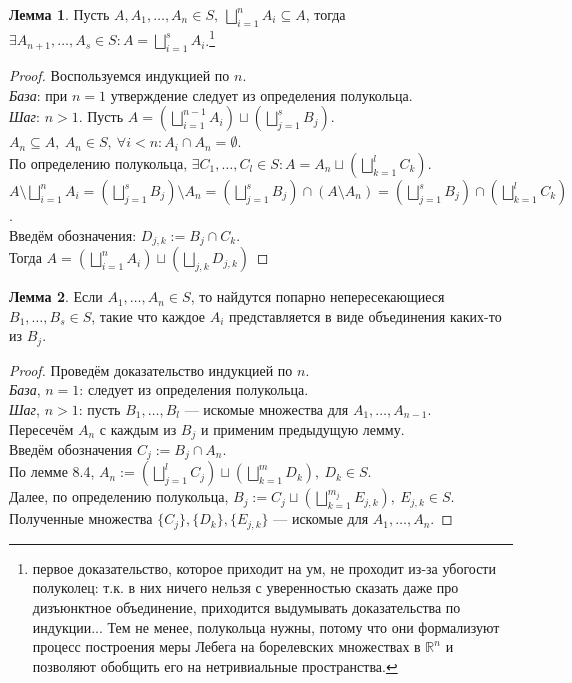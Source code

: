 \documentclass[11pt,a4paper]{report}
\theoremstyle{definition}
\theoremstyle{definition}
\newtheorem{lemma}{Лемма}[section]
\theoremstyle{definition}
\begin{document}
	\begin{lemma}
		Пусть $ A, A_{1}, \dots, A_{n} \in S,\ \bigsqcup_{i=1}^{n}{A_{i}} \subseteq A $, тогда $ \exists A_{n+1}, \dots, A_{s} \in S: A = \bigsqcup_{i=1}^{s}{A_{i}} $.\footnote{первое доказательство, которое приходит на ум, не проходит из-за убогости полуколец: т.к. в них ничего нельзя с уверенностью сказать даже про дизъюнктное объединение, приходится выдумывать доказательства по индукции... Тем не менее, полукольца нужны, потому что они формализуют процесс построения меры Лебега на борелевских множествах в $ \mathbb{R}^{n} $ и позволяют обобщить его на нетривиальные пространства.}   
	\end{lemma}
	\begin{proof}
		Воспользуемся индукцией по $ n $.\\
		\textit{База}: при $ n = 1 $ утверждение следует из определения полукольца.\\
		\textit{Шаг}: $ n > 1 $. Пусть $ A = (\bigsqcup_{i=1}^{n-1}{A_{i}}) \sqcup (\bigsqcup_{j=1}^{s}{B_{j}}) $.\\
		$ A_{n} \subseteq A,\ A_{n} \in S,\ \forall i < n: A_{i} \cap A_{n} = \emptyset $.\\ 
		По определению полукольца, $ \exists C_{1}, \dots, C_{l} \in S: A = A_{n} \sqcup (\bigsqcup_{k=1}^{l}{C_{k}}) $.\\
		$ A \setminus \bigsqcup_{i=1}^{n}{A_{i}} = (\bigsqcup_{j=1}^{s}{B_{j}}) \setminus A_{n} = (\bigsqcup_{j=1}^{s}{B_{j}}) \cap (A \setminus A_{n}) = (\bigsqcup_{j=1}^{s}{B_{j}}) \cap (\bigsqcup_{k=1}^{l}{C_{k}}) $.\\
		Введём обозначения: $ D_{j, k} := B_{j} \cap C_{k} $.\\
		Тогда $ A = (\bigsqcup_{i=1}^{n}{A_{i}}) \sqcup (\bigsqcup_{j, k} D_{j, k}) $
	\end{proof}
	\begin{lemma}
		Если $ A_{1}, \dots, A_{n} \in S $, то найдутся попарно непересекающиеся $ B_{1}, \dots, B_{s} \in S $, такие что каждое $ A_{i} $ представляется в виде объединения каких-то из $ B_{j} $.
	\end{lemma}
	\begin{proof}
		Проведём доказательство индукцией по $ n $.\\
		\textit{База}, $ n = 1 $: следует из определения полукольца.\\
		\textit{Шаг}, $ n > 1 $: пусть $ B_{1}, \dots, B_{l} $ — искомые множества для $ A_{1}, \dots, A_{n-1} $.\\
		Пересечём $ A_{n} $ с каждым из $ B_{j} $ и применим предыдущую лемму.\\
		Введём обозначения $ C_{j} := B_{j} \cap A_{n} $.\\
		По лемме 8.4, $ A_{n} := (\bigsqcup_{j=1}^{l} C_{j}) \sqcup (\bigsqcup_{k=1}^{m} D_{k}),\ D_{k} \in S $.\\ 
		Далее, по определению полукольца, $ B_{j} := C_{j} \sqcup (\bigsqcup_{k=1}^{m_{j}}{E_{j, k}}),\ E_{j, k} \in S $.\\
		Полученные множества $ \{C_{j}\}, \{D_{k}\}, \{E_{j, k}\} $ — искомые для $ A_{1}, \dots, A_{n} $.
	\end{proof}
\end{document}
